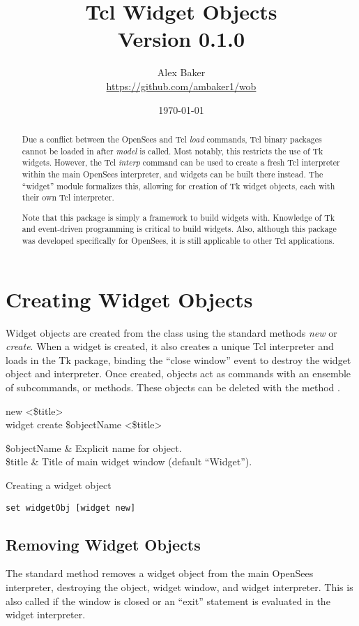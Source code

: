 \documentclass{article}
\title{\Huge Tcl Widget Objects\\\small Version 0.1.0}
\author{Alex Baker\\\small\hyperlink{https://github.com/ambaker1/wob}{https://github.com/ambaker1/wob}}
\date{\small\today}
\renewcommand{\^}[1]{\textsuperscript{#1}}
\renewcommand{\_}[1]{\textsubscript{#1}}
\begin{document}
\maketitle
\begin{abstract}
Due a conflict between the OpenSees and Tcl \textit{load} commands, Tcl binary packages cannot be loaded in after \textit{model} is called. Most notably, this restricts the use of Tk widgets. 
However, the Tcl \textit{interp} command can be used to create a fresh Tcl interpreter within the main OpenSees interpreter, and widgets can be built there instead. 
The ``widget'' module formalizes this, allowing for creation of Tk widget objects, each with their own Tcl interpreter.

Note that this package is simply a framework to build widgets with. 
Knowledge of Tk and event-driven programming is critical to build widgets.
Also, although this package was developed specifically for OpenSees, it is still applicable to other Tcl applications.
\end{abstract}

\clearpage
\section{Creating Widget Objects}
Widget objects are created from the  class using the standard methods \textit{new} or \textit{create}. 
When a widget is created, it also creates a unique Tcl interpreter and loads in the Tk package, binding the ``close window'' event to destroy the widget object and interpreter.
Once created,  objects act as commands with an ensemble of subcommands, or methods. 
These objects can be deleted with the method .
\begin{syntax}
   	 new <\$title> \\
   	widget create \$objectName <\$title>
\end{syntax}
\begin{args}
   	\$objectName & Explicit name for object. \\
   	\$title & Title of main widget window (default ``Widget'').
\end{args}
\begin{example}{Creating a widget object}
\begin{lstlisting}
set widgetObj [widget new]
\end{lstlisting}
\end{example}
\subsection{Removing Widget Objects}
The standard method  removes a widget object from the main OpenSees interpreter, destroying the object, widget window, and widget interpreter.
This is also called if the window is closed or an ``exit'' statement is evaluated in the widget interpreter.
\begin{syntax}
\end{syntax}
\end{document}
